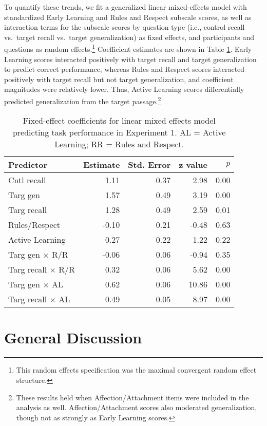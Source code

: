 \documentclass[10pt, letterpaper]{article}
\begin{document}
To quantify these trends, we fit a generalized linear mixed-effects
model with standardized Early Learning and Rules and Respect subscale
scores, as well as interaction terms for the subscale scores by question
type (i.e., control recall vs.~target recall vs.~target generalization)
as fixed effects, and participants and questions as random
effects.\footnote{This random effects specification was the maximal
  convergent random effect structure.} Coefficient estimates are shown
in Table \ref{tab:lmer}. Early Learning scores interacted positively
with target recall and target generalization to predict correct
performance, whereas Rules and Respect scores interacted positively with
target recall but not target generalization, and coefficient magnitudes
were relatively lower. Thus, Active Learning scores differentially
predicted generalization from the target passage.\footnote{These results
  held when Affection/Attachment items were included in the analysis as
  well. Affection/Attachment scores also moderated generalization,
  though not as strongly as Early Learning scores.}

\begin{table}[t]
\centering
\begin{tabular}{lrrrr}
  \hline
Predictor & Estimate & Std. Error & z value & $p$ \\ 
  \hline
  Cntl recall & 1.11 & 0.37 & 2.98 & 0.00 \\ 
  Targ gen & 1.57 & 0.49 & 3.19 & 0.00 \\ 
  Targ recall & 1.28 & 0.49 & 2.59 & 0.01 \\ 
  Rules/Respect & -0.10 & 0.21 & -0.48 & 0.63 \\ 
  Active Learning & 0.27 & 0.22 & 1.22 & 0.22 \\ 
  Targ gen $\times$ R/R & -0.06 & 0.06 & -0.94 & 0.35 \\ 
  Targ recall $\times$ R/R& 0.32 & 0.06 & 5.62 & 0.00 \\ 
  Targ gen $\times$ AL & 0.62 & 0.06 & 10.86 & 0.00 \\ 
  Targ recall $\times$ AL & 0.49 & 0.05 & 8.97 & 0.00 \\ 
   \hline
\end{tabular}
\caption{Fixed-effect coefficients for linear mixed effects model predicting task performance in Experiment 1. AL = Active Learning; RR = Rules and Respect.\label{tab:lmer}} 
\end{table}

\section{General Discussion}\label{general-discussion}
\end{document}
